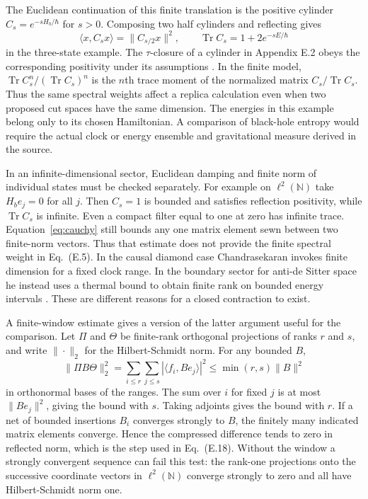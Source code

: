 \documentclass[11pt,letterpaper]{article}
\newcommand{\tr}{\operatorname{Tr}}
\begin{document}
The Euclidean continuation of this finite translation is the positive
cylinder \(C_s=e^{-sH_b/\hbar}\) for \(s>0\). Composing two half cylinders
and reflecting gives
\[
 \langle x,C_s x\rangle=\|C_{s/2} x\|^2,\qquad
 \tr C_s = 1+2e^{-sE/\hbar}
\]
in the three-state example. The \(\tau\)-closure of a cylinder in
Appendix E.2 obeys the corresponding positivity under its assumptions
\cite[Eq.~(E.8)]{nc}. In the finite model,
\(\tr C_s^n /(\tr C_s)^n\) is the \(n\)th trace moment of the normalized
matrix \(C_s/\tr C_s\). Thus the same spectral weights affect a replica
calculation even when two proposed cut spaces have the same dimension.
The energies in this example belong only to its chosen Hamiltonian.
A comparison of black-hole entropy would require the actual clock or
energy ensemble and gravitational measure derived in the source.

In an infinite-dimensional sector, Euclidean damping and finite norm of
individual states must be checked separately. For example on
\(\ell^2(\mathbb N)\) take \(H_b e_j=0\) for all \(j\).
Then \(C_s=1\) is bounded and satisfies reflection positivity, while
\(\tr C_s\) is infinite. Even a compact filter equal to one at zero
has infinite trace. Equation~\eqref{eq:cauchy} still bounds any one
matrix element sewn between two finite-norm vectors. Thus that estimate
does not provide the finite spectral weight in Eq.~(E.5). In the causal
diamond case Chandrasekaran invokes finite dimension for a fixed clock
range. In the boundary sector for anti-de Sitter space he instead uses
a thermal bound to obtain finite rank on bounded energy intervals
\cite[App.~E.3]{nc}. These are different reasons for a closed contraction
to exist.

A finite-window estimate gives a version of the latter argument useful
for the comparison. Let \(\Pi\) and \(\Theta\) be finite-rank orthogonal
projections of ranks \(r\) and \(s\), and write \(\|\cdot\|_2\) for the
Hilbert-Schmidt norm. For any bounded \(B\),
\[
 \|\Pi B\Theta\|_2^2
  =\sum_{i\le r}\sum_{j\le s}|\langle f_i,B e_j\rangle|^2
  \le \min(r,s)\|B\|^2
\]
in orthonormal bases of the ranges. The sum over \(i\) for fixed \(j\)
is at most \(\|B e_j\|^2\), giving the bound with \(s\). Taking adjoints
gives the bound with \(r\). If a net of bounded insertions \(B_i\)
converges strongly to \(B\), the finitely many indicated matrix elements
converge. Hence the compressed difference tends to zero in reflected norm,
which is the step used in Eq.~(E.18). Without the window a strongly
convergent sequence can fail this test: the rank-one projections onto the
successive coordinate vectors in \(\ell^2(\mathbb N)\) converge strongly
to zero and all have Hilbert-Schmidt norm one.
\end{document}
